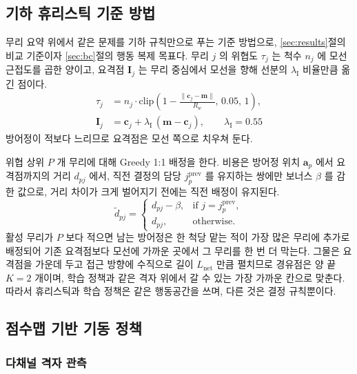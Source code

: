 \subsection{기하 휴리스틱 기준 방법}
\label{sec:heuristic}

무리 요약 위에서 같은 문제를 기하 규칙만으로 푸는 기준 방법으로, \ref{sec:results}절의 비교
기준이자 \ref{sec:bc}절의 행동 복제 목표다. 무리 $j$ 의 위협도 $\tau_j$ 는 척수 $n_j$ 에 모선
근접도를 곱한 양이고, 요격점 $\mathbf{I}_j$ 는 무리 중심에서 모선을 향해 선분의 $\lambda_{\mathrm{I}}$
비율만큼 옮긴 점이다.
\begin{equation}
\begin{aligned}
\tau_j &= n_j \cdot \mathrm{clip}\!\left(1 - \frac{\lVert \mathbf{c}_j - \mathbf{m}\rVert}{R_w},
         \, 0.05,\, 1\right),\\
\mathbf{I}_j &= \mathbf{c}_j + \lambda_{\mathrm{I}}\,(\mathbf{m} - \mathbf{c}_j), \qquad \lambda_{\mathrm{I}} = 0.55
\end{aligned}
\label{eq:threat}
\end{equation}
방어정이 적보다 느리므로 요격점은 모선 쪽으로 치우쳐 둔다.

위협 상위 $P$ 개 무리에 대해 Greedy 1:1 배정을 한다. 비용은 방어정 위치 $\mathbf{a}_p$ 에서
요격점까지의 거리 $d_{pj}$ 에서, 직전 결정의 담당 $j_p^{\text{prev}}$ 를 유지하는 쌍에만
보너스 $\beta$ 를 감한 값으로, 거리 차이가 크게 벌어지기 전에는 직전 배정이 유지된다.
\begin{equation}
\tilde{d}_{pj} = \begin{cases}
  d_{pj} - \beta, & \text{if } j = j_p^{\text{prev}},\\
  d_{pj},          & \text{otherwise}.
\end{cases}
\label{eq:sticky}
\end{equation}
활성 무리가 $P$ 보다 적으면 남는 방어정은 한 척당 맡는 적이 가장 많은 무리에 추가로 배정되어
기존 요격점보다 모선에 가까운 곳에서 그 무리를 한 번 더 막는다. 그물은 요격점을 가운데 두고 접근
방향에 수직으로 길이 $L_{\mathrm{net}}$ 만큼 펼치므로 경유점은 양 끝 $K = 2$ 개이며, 학습 정책과
같은 격자 위에서 갈 수 있는 가장 가까운 칸으로 맞춘다. 따라서 휴리스틱과 학습 정책은 같은
행동공간을 쓰며, 다른 것은 결정 규칙뿐이다.

\subsection{점수맵 기반 기동 정책}
\label{sec:policy}

\subsubsection{다채널 격자 관측}
\label{sec:obs}

